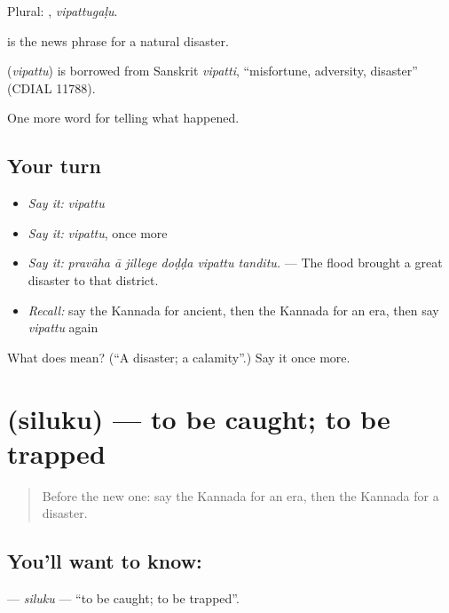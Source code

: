 Plural: , \emph{vipattugaḷu}.

  is the news phrase for a natural disaster.

\begin{cousinweb}
\textbf{} (\emph{vipattu}) is borrowed from Sanskrit \emph{vipatti}, \textquotedblleft{}misfortune, adversity, disaster\textquotedblright{} (CDIAL 11788).
\end{cousinweb}

\begin{grammarlens}[title={What you've built}]
One more word for telling what happened.
\end{grammarlens}

\subsection*{Your turn}
\begin{itemize}
\raggedright
  \item \emph{Say it:} \emph{vipattu}
  \item \emph{Say it:} \emph{vipattu}, once more
  \item \emph{Say it:} \emph{pravāha ā jillege doḍḍa vipattu tanditu.} — The flood brought a great disaster to that district.
  \item \emph{Recall:} say the Kannada for ancient, then the Kannada for an era, then say \emph{vipattu} again
\end{itemize}

\begin{tcolorbox}[breakable,colback=teal!4,colframe=teal!35!black,title={Before you move on}]
What does  mean? (\textquotedblleft{}A disaster; a calamity\textquotedblright{}.) Say it once more.
\end{tcolorbox}
\section[\texorpdfstring{\kn{ಸಿಲುಕು} (siluku)}{ಸಿಲುಕು (siluku)}]{ (siluku) — to be caught; to be trapped}

\label{lesson:KA-C332-siluku}



\begin{quote}
Before the new one: say the Kannada for an era, then the Kannada for a disaster.
\end{quote}

\subsection*{You'll want to know: }
\textbf{} — \emph{siluku} — \textquotedblleft{}to be caught; to be trapped\textquotedblright{}.

